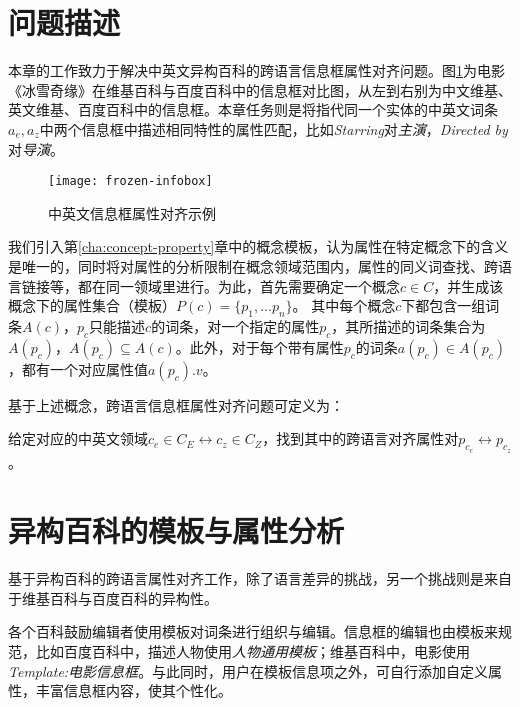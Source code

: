 \section{问题描述}
本章的工作致力于解决中英文异构百科的跨语言信息框属性对齐问题。图\ref{fig:frozen-infobox}为电影《冰雪奇缘》在维基百科与百度百科中的信息框对比图，从左到右别为中文维基、英文维基、百度百科中的信息框。本章任务则是将指代同一个实体的中英文词条$a_e,a_z$中两个信息框中描述相同特性的属性匹配，比如\textit{Starring}对\textit{主演}，\textit{Directed by}对\textit{导演}。

\begin{figure}[H]
  \centering
  \texttt{[image: frozen-infobox]}
  \caption{中英文信息框属性对齐示例}
  \label{fig:frozen-infobox}
\end{figure}

我们引入第\ref{cha:concept-property}章中的{\heiti 概念模板}，认为属性在特定概念下的含义是唯一的，同时将对属性的分析限制在概念领域范围内，属性的同义词查找、跨语言链接等，都在同一领域里进行。为此，首先需要确定一个概念$c \in C$，并生成该概念下的属性集合（模板）$P(c)=\{p_1,...p_n\}$。
其中每个概念$c$下都包含一组词条$A(c)$，$p_c$只能描述$c$的词条，对一个指定的属性$p_c$，其所描述的词条集合为$A(p_c)$，$A(p_c) \subseteq A(c)$。此外，对于每个带有属性$p_c$的词条$a(p_c) \in A(p_c)$，都有一个对应属性值$a(p_c).v$。

基于上述概念，跨语言信息框属性对齐问题可定义为：
\begin{definition}
给定对应的中英文领域$c_e \in C_E \leftrightarrow c_z \in C_Z$，找到其中的跨语言对齐属性对$p_{c_e} \leftrightarrow p_{c_z}$。
\end{definition}

\section{异构百科的模板与属性分析}
\label{sec:template-property-analysis}

基于异构百科的跨语言属性对齐工作，除了语言差异的挑战，另一个挑战则是来自于维基百科与百度百科的异构性。

各个百科鼓励编辑者使用模板对词条进行组织与编辑。信息框的编辑也由模板来规范，比如百度百科中，描述人物使用\textit{人物通用模板}；维基百科中，电影使用\textit{Template:电影信息框}。与此同时，用户在模板信息项之外，可自行添加自定义属性，丰富信息框内容，使其个性化。

